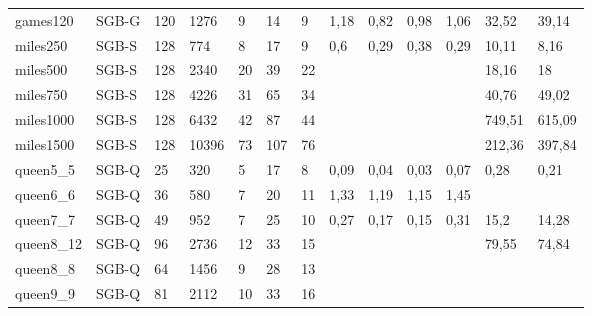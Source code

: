 \documentclass{sig-alternate}
\begin{document}
\begin{table*}[b]
{\begin{tabular}{lllllllllllll}
games120 & SGB-G & 120 & 1276 & 9 & 14 & 9 & 1,18 & 0,82 & 0,98 & 1,06 & 32,52 & 39,14 \\
miles250 & SGB-S & 128 & 774 & 8 & 17 & 9 & 0,6 & 0,29 & 0,38 & 0,29 & 10,11 & 8,16 \\
miles500 & SGB-S & 128 & 2340 & 20 & 39 & 22 &  &  &  &  & 18,16 & 18 \\
miles750 & SGB-S & 128 & 4226 & 31 & 65 & 34 &  &  &  &  & 40,76 & 49,02 \\
miles1000 & SGB-S & 128 & 6432 & 42 & 87 & 44 &  &  &  &  & 749,51 & 615,09 \\
miles1500 & SGB-S & 128 & 10396 & 73 & 107 & 76 &  &  &  &  & 212,36 & 397,84 \\
queen5\_5 & SGB-Q & 25 & 320 & 5 & 17 & 8 & 0,09 & 0,04 & 0,03 & 0,07 & 0,28 & 0,21 \\
queen6\_6 & SGB-Q & 36 & 580 & 7 & 20 & 11 & 1,33 & 1,19 & 1,15 & 1,45 &  &  \\
queen7\_7 & SGB-Q & 49 & 952 & 7 & 25 & 10 & 0,27 & 0,17 & 0,15 & 0,31 & 15,2 & 14,28 \\
queen8\_12 & SGB-Q & 96 & 2736 & 12 & 33 & 15 &  &  &  &  & 79,55 & 74,84 \\
queen8\_8 & SGB-Q & 64 & 1456 & 9 & 28 & 13 &  &  &  &  &  &  \\
queen9\_9 & SGB-Q & 81 & 2112 & 10 & 33 & 16 &  &  &  &  &  & 
\end{tabular}
}
\end{table*}
\end{document}
